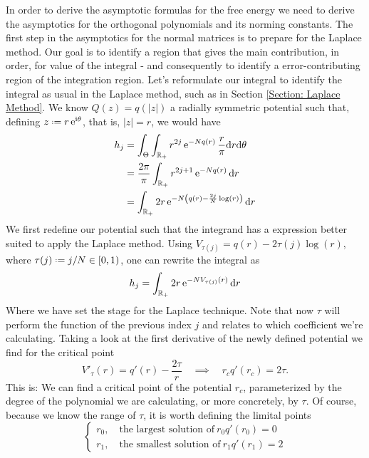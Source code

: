 In order to derive the asymptotic formulas for the free energy we need to derive the asymptotics for the orthogonal polynomials and its norming constants. The first step in the asymptotics for the normal matrices is to prepare for the Laplace method. Our goal is to identify a region that gives the main contribution, in order, for value of the integral - and consequently to identify a error-contributing region of the integration region. Let's reformulate our integral to identify the integral as usual in the Laplace method, such as in Section \ref{Section: Laplace Method}. We know $Q(z) = q(|z|)$ a radially symmetric potential such that, defining $z \deff r \ee^{\ii \theta}$, that is, $|z| = r$, we would have
\begin{align}
	h_j & = \int_{\Theta} \int_{\mathbb{R}_+} r^{2j} \operatorname{e}^{-N q(r)} \frac{r}{\pi} \mathrm{d} r \mathrm{d} \theta \\
	& = \frac{2 \pi}{\pi} \int_{\mathbb{R}_+} r^{2j+1} \operatorname{e}^{-N q(r)} \mathrm{d} r \\
	& =  \int_{\mathbb{R}_+} 2 r \operatorname{e}^{-N \left( q(r) - \frac{2j}{N} \log(r) \right)} \mathrm{d} r
\end{align}
We first redefine our potential such that the integrand has a expression better suited to apply the Laplace method. Using $V_{\tau(j)} = q(r) - 2 \tau(j) \log(r)$, where $\tau(j) \deff j/N \in [0, 1)$, one can rewrite the integral as
\begin{equation}
	h_j = \int_{\mathbb{R}_+} 2r \operatorname{e}^{-N V_{\tau(j)}(r)} \mathrm{d} r
\end{equation}
Where we have set the stage for the Laplace technique. Note that now $\tau$ will perform the function of the previous index $j$ and relates to which coefficient we're calculating. Taking a look at the first derivative of the newly defined potential we find for the critical point
\begin{equation}
	V'_\tau(r) = q'(r) - \frac{2\tau}{r} \quad \implies \quad r_c q'(r_c) = 2 \tau.
\end{equation}
This is: We can find a critical point of the potential $r_c$, parameterized by the degree of the polynomial we are calculating, or more concretely, by $\tau$. Of course, because we know the range of $\tau$, it is worth defining the limital points
\begin{equation}
	\begin{cases}
		r_0, \quad \text{the largest solution of} \ r_0 q'(r_0) = 0 \\
		r_ 1, \quad \text{the smallest solution of} \ r_1 q'(r_1) = 2
	\end{cases}
\end{equation}
